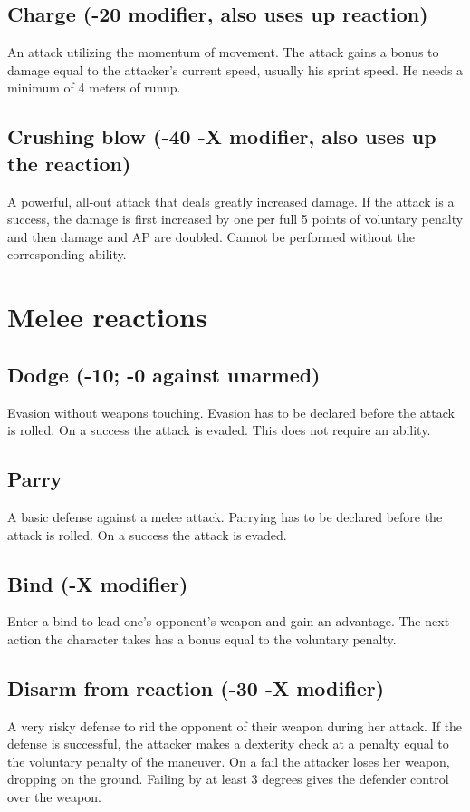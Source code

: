 \documentclass[12pt,a4paper,openany]{book}
\begin{document}
	\subsection*{Charge (-20 modifier, also uses up reaction)}
	An attack utilizing the momentum of movement. The attack gains a bonus to damage equal to the attacker’s current speed, usually his sprint speed. He needs a minimum of 4 meters of runup.
	\subsection*{Crushing blow (-40 -X modifier, also uses up the reaction)}
	A powerful, all-out attack that deals greatly increased damage. If the attack is a success, the damage is first increased by one per full 5 points of voluntary penalty and then damage and AP are doubled. Cannot be performed without the corresponding ability.
	\section{Melee reactions}
	\subsection*{Dodge (-10; -0 against unarmed)}
	Evasion without weapons touching. Evasion has to be declared before the attack is rolled. On a success the attack is evaded. This does not require an ability.
	\subsection*{Parry}
	A basic defense against a melee attack. Parrying has to be declared before the attack is rolled. On a success the attack is evaded.
	\subsection*{Bind (-X modifier)}
	Enter a bind to lead one’s opponent’s weapon and gain an advantage. The next action the character takes has a bonus equal to the voluntary penalty.
	\subsection*{Disarm from reaction (-30 -X modifier)}
	A very risky defense to rid the opponent of their weapon during her attack. If the defense is successful, the attacker makes a dexterity check at a penalty equal to the voluntary penalty of the maneuver. On a fail the attacker loses her weapon, dropping on the ground. Failing by at least 3 degrees gives the defender control over the weapon.
\end{document}
